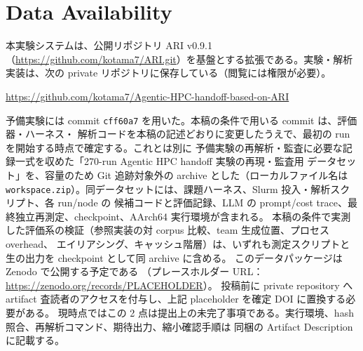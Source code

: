 \documentclass[conference,letterpaper]{IEEEtran}
\begin{document}
\section*{Data Availability}
\begingroup\small
本実験システムは、公開リポジトリ ARI v0.9.1
（\url{https://github.com/kotama7/ARI.git}）を基盤とする拡張である。実験・解析実装は、次の
private リポジトリに保存している（閲覧には権限が必要）。
\par\smallskip
\noindent\url{https://github.com/kotama7/Agentic-HPC-handoff-based-on-ARI}
\par\smallskip
予備実験には commit \texttt{cff60a7} を用いた。本稿の条件で用いる commit は、評価器・ハーネス・
解析コードを本稿の記述どおりに変更したうえで、最初の run を開始する時点で確定する。これとは別に
予備実験の再解析・監査に必要な記録一式を収めた「270-run Agentic HPC handoff 実験の再現・監査用
データセット」を、容量のため Git 追跡対象外の archive とした（ローカルファイル名は
\texttt{workspace.zip}）。同データセットには、課題ハーネス、Slurm 投入・解析スクリプト、各 run/node の
候補コードと評価記録、LLM の prompt/cost trace、最終独立再測定、checkpoint、AArch64 実行環境が含まれる。
本稿の条件で実測した評価系の検証（参照実装の対 corpus 比較、team 生成位置、プロセス overhead、
エイリアシング、キャッシュ階層）は、いずれも測定スクリプトと生の出力を checkpoint として同 archive に含める。
このデータパッケージは Zenodo で公開する予定である
（プレースホルダー URL：\url{https://zenodo.org/records/PLACEHOLDER}）。
投稿前に private repository へ artifact 査読者のアクセスを付与し、上記 placeholder を確定 DOI に置換する必要がある。
現時点ではこの 2 点は提出上の未完了事項である。実行環境、hash 照合、再解析コマンド、期待出力、縮小確認手順は
同梱の Artifact Description に記載する。
\par\endgroup
\end{document}
